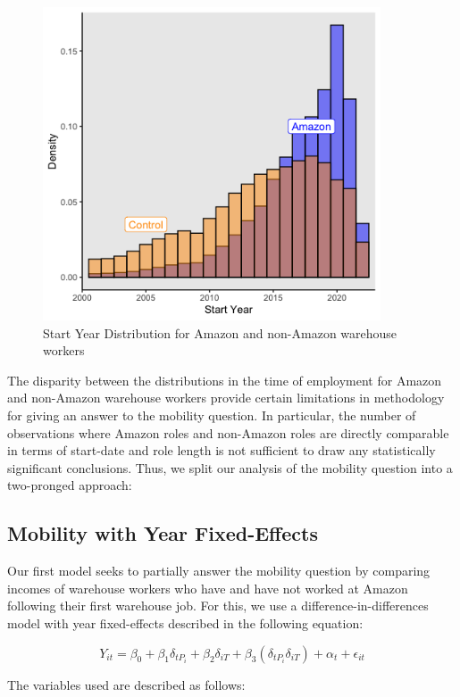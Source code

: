\documentclass[11pt]{article}
\begin{document}
\begin{figure}[H]
\centering
\includegraphics[width=10cm]{Rplot04.png}
\caption{Start Year Distribution for Amazon and non-Amazon warehouse workers}
\end{figure}

\-\hspace{0.5cm} The disparity between the distributions in the time of employment for Amazon and non-Amazon warehouse workers provide certain limitations in methodology for giving an answer to the mobility question. In particular, the number of observations where Amazon roles and non-Amazon roles are directly comparable in terms of start-date and role length is not sufficient to draw any statistically significant conclusions. Thus, we split our analysis of the mobility question into a two-pronged approach: 

\subsection{Mobility with Year Fixed-Effects}

\-\hspace{0.5cm} Our first model seeks to partially answer the mobility question by comparing incomes of warehouse workers who have and have not worked at Amazon following their first warehouse job. For this, we use a difference-in-differences model with year fixed-effects described in the following equation:

$$Y_{it} = \beta_0+ \beta_1 \delta_{tP_i} + \beta_2\delta_{iT} + \beta_3(\delta_{tP_i}\delta_{iT}) + \alpha_t+ \epsilon_{it}$$

The variables used are described as follows: 
\end{document}
